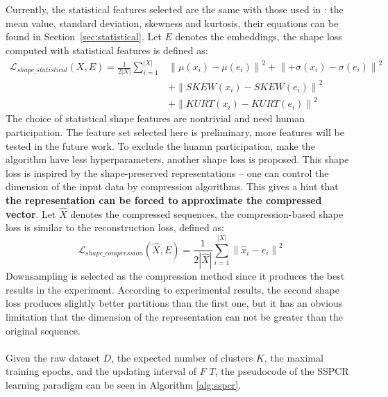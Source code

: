 \\\\Currently, the statistical features selected are the same with those used in \cite{nanopoulos2001feature}: the mean value, standard deviation, skewness and kurtosis, their equations can be found in Section~\ref{sec:statistical}. Let $E$ denotes the embeddings, the shape loss computed with statistical features is defined as:
\begin{equation}
    \begin{aligned}
        \mathcal{L}_{shape\_statistical}(X,E) = \frac{1}{2|X|} \sum_{i=1}^{|X|} &  \left\| \mu(x_i) - \mu(e_i) \right\| ^2 + \left\| + \sigma(x_i) - \sigma(e_i) \right\| ^2 \\ 
        & + \left\| SKEW(x_i) - SKEW(e_i) \right\| ^2 \\
        & + \left\| KURT(x_i) - KURT(e_i) \right\| ^2
    \end{aligned}
    \label{eq:shapeloss1}
\end{equation}
The choice of statistical shape features are nontrivial and need human participation. The feature set selected here is preliminary, more features will be tested in the future work. To exclude the huamn participation, make the algorithm have less hyperparameters, another shape loss is proposed. This shape loss is inspired by the shape-preserved representations -- one can control the dimension of the input data by compression algorithms. This gives a hint that \textbf{the representation can be forced to approximate the compressed vector}. Let $\hat{X}$ denotes the compressed sequences, the compression-based shape loss is similar to the reconstruction loss, defined as:
\begin{equation}
    \mathcal{L}_{shape\_compression}(\hat{X},E) = \frac{1}{2|\hat{X}|}\sum_{i=1}^{|X|} \left\|\hat{x}_i - e_i \right\|^2
    \label{eq:shapeloss2}
\end{equation}
Downsampling is selected as the compression method since it produces the best results in the experiment. According to experimental results, the second shape loss produces slightly better partitions than the first one, but it has an obvious limitation that the dimension of the representation can not be greater than the original sequence.
\\\\Given the raw dataset $D$, the expected number of clusters $K$, the maximal training epochs, and the updating interval of $F$ $T$, the pseudocode of the SSPCR learning paradigm can be seen in Algorithm \ref{alg:sspcr}.
